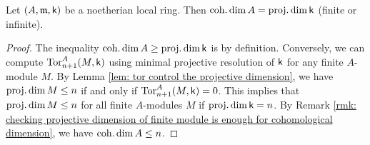 

    \begin{proposition}\label{prop: cohomological dimension of local ring is projective dimension of residue field}
        Let \((A,{\mathfrak{m}},{\mathsf{k}})\) be a noetherian local ring.
        Then \(\operatorname{coh.dim} A = \operatorname{proj.dim} {\mathsf{k}}\) (finite or infinite).
    \end{proposition}
    \begin{proof}
        The inequality \(\operatorname{coh.dim} A \geq \operatorname{proj.dim} {\mathsf{k}}\) is by definition.
        Conversely, we can compute \(\operatorname{Tor}_{n+1}^A(M,{\mathsf{k}})\) using minimal projective resolution of \({\mathsf{k}}\) for any finite \(A\)-module \(M\).
        By Lemma \ref{lem: tor control the projective dimension}, we have \(\operatorname{proj.dim} M \leq n\) if and only if \(\operatorname{Tor}_{n+1}^A(M,{\mathsf{k}}) = 0\).
        This implies that \(\operatorname{proj.dim} M \leq n\) for all finite \(A\)-modules \(M\) if \(\operatorname{proj.dim} {\mathsf{k}} = n\).
        By Remark \ref{rmk: checking projective dimension of finite module is enough for cohomological dimension}, we have \(\operatorname{coh.dim} A \leq n\).
    \end{proof}


